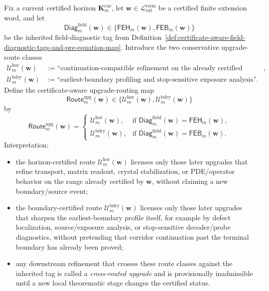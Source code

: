 \begin{definition}
\label{def:certificate-aware-upgrade-routing-map}
Fix a current certified horizon \(\mathbf K_m^{\mathrm{cur}}\), let \(\mathbf w\in \mathcal L_{\mathrm{ext}}^{\mathrm{term}}\) be a certified finite extension word, and let
\[
 \mathsf{Diag}^{\mathrm{field}}_{m}(\mathbf w)
 \in
 \{\mathsf{FEH}_{m}(\mathbf w),\mathsf{FEB}_{m}(\mathbf w)\}
\]
be the inherited field-diagnostic tag from Definition~\ref{def:certificate-aware-field-diagnostic-tags-and-pre-equation-map}. Introduce the two conservative upgrade-route classes
\begin{align*}
 \mathcal U^{\mathrm{hor}}_{m}(\mathbf w)
 &:= \text{``continuation-compatible refinement on the already certified range''},\\
 \mathcal U^{\mathrm{bdry}}_{m}(\mathbf w)
 &:= \text{``earliest-boundary profiling and stop-sensitive exposure analysis''}.
\end{align*}
Define the certificate-aware upgrade-routing map
\[
 \mathsf{Route}^{\mathrm{upg}}_{m}(\mathbf w)
 \in
 \{\mathcal U^{\mathrm{hor}}_{m}(\mathbf w),\mathcal U^{\mathrm{bdry}}_{m}(\mathbf w)\}
\]
by
\[
 \mathsf{Route}^{\mathrm{upg}}_{m}(\mathbf w)
 =
 \begin{cases}
 \mathcal U^{\mathrm{hor}}_{m}(\mathbf w), & \text{if }\mathsf{Diag}^{\mathrm{field}}_{m}(\mathbf w)=\mathsf{FEH}_{m}(\mathbf w),\\[2mm]
 \mathcal U^{\mathrm{bdry}}_{m}(\mathbf w), & \text{if }\mathsf{Diag}^{\mathrm{field}}_{m}(\mathbf w)=\mathsf{FEB}_{m}(\mathbf w).
 \end{cases}
\]
Interpretation:
\begin{itemize}[leftmargin=2em]
 \item the horizon-certified route \(\mathcal U^{\mathrm{hor}}_{m}(\mathbf w)\) licenses only those later upgrades that refine transport, matrix readout, crystal stabilization, or PDE/operator behavior on the range already certified by \(\mathbf w\), without claiming a new boundary/source event;
 \item the boundary-certified route \(\mathcal U^{\mathrm{bdry}}_{m}(\mathbf w)\) licenses only those later upgrades that sharpen the earliest-boundary profile itself, for example by defect localization, source/exposure analysis, or stop-sensitive decoder/probe diagnostics, without pretending that corridor continuation past the terminal boundary has already been proved;
 \item any downstream refinement that crosses these route classes against the inherited tag is called a \emph{cross-routed upgrade} and is provisionally inadmissible until a new local theorematic stage changes the certified status.
\end{itemize}
\end{definition}

